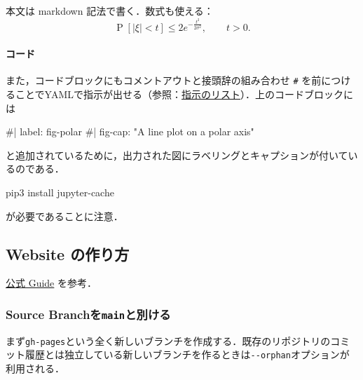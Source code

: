 \documentclass[
]{ltjsarticle}
\newenvironment{Shaded}{\begin{snugshade}}{\end{snugshade}}
\newcommand{\CommentTok}[1]{\textcolor[rgb]{0.37,0.37,0.37}{#1}}
\newcommand{\ExtensionTok}[1]{\textcolor[rgb]{0.00,0.23,0.31}{#1}}
\newcommand{\NormalTok}[1]{\textcolor[rgb]{0.00,0.23,0.31}{#1}}
\begin{document}
本文は markdown 記法で書く．数式も使える： \[
\operatorname{P}[\lvert\xi\rvert<t]\le2e^{-\frac{t^2}{2\sigma^2}},\qquad t>0.
\]

\paragraph{コード}\label{ux30b3ux30fcux30c9}

また，コードブロックにもコメントアウトと接頭辞の組み合わせ
\texttt{\#\textbar{}}
を前につけることでYAMLで指示が出せる（参照：\href{https://quarto.org/docs/reference/cells/cells-jupyter.html}{指示のリスト}）．上のコードブロックには

\begin{Shaded}
\begin{Highlighting}[]
\CommentTok{\#| label: fig{-}polar}
\CommentTok{\#| fig{-}cap: "A line plot on a polar axis"}
\end{Highlighting}
\end{Shaded}

と追加されているために，出力された図にラベリングとキャプションが付いているのである．

\begin{Shaded}
\begin{Highlighting}[]
\ExtensionTok{pip3}\NormalTok{ install jupyter{-}cache}
\end{Highlighting}
\end{Shaded}

が必要であることに注意．

\subsection{Website の作り方}\label{website-ux306eux4f5cux308aux65b9}

\href{https://quarto.org/docs/publishing/github-pages.html}{公式 Guide}
を参考．

\subsubsection{\texorpdfstring{Source
Branchを\texttt{main}と別ける}{Source Branchをmainと別ける}}\label{source-branchux3092mainux3068ux5225ux3051ux308b}

まず\texttt{gh-pages}という全く新しいブランチを作成する．既存のリポジトリのコミット履歴とは独立している新しいブランチを作るときは\texttt{-\/-orphan}オプションが利用される．
\end{document}
